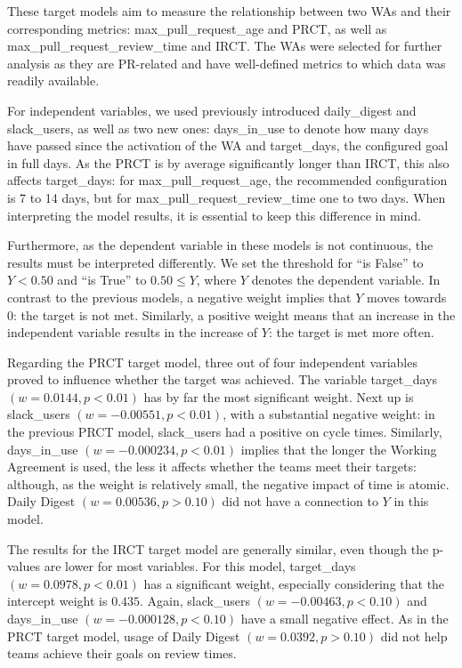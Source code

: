 

These target models aim to measure the relationship between two WAs and their corresponding metrics: max\_pull\_request\_age and PRCT, as well as max\_pull\_request\_review\_time and IRCT. The WAs were selected for further analysis as they are PR-related and have well-defined metrics to which data was readily available.

For independent variables, we used previously introduced daily\_digest and slack\_users, as well as two new ones: days\_in\_use to denote how many days have passed since the activation of the WA and target\_days, the configured goal in full days. As the PRCT is by average significantly longer than IRCT, this also affects target\_days: for max\_pull\_request\_age, the recommended configuration is 7 to 14 days, but for max\_pull\_request\_review\_time one to two days. When interpreting the model results, it is essential to keep this difference in mind. 

Furthermore, as the dependent variable in these models is not continuous, the results must be interpreted differently. We set the threshold for ``is False'' to  $Y<0.50$ and ``is True'' to $0.50\leq Y$, where $Y$ denotes the dependent variable. In contrast to the previous models, a negative weight implies that $Y$ moves towards 0: the target is not met. Similarly, a positive weight means that an increase in the independent variable results in the increase of $Y$: the target is met more often.



Regarding the PRCT target model, three out of four independent variables proved to influence whether the target was achieved. The variable target\_days $(w=0.0144, p<0.01)$ has by far the most significant weight. Next up is slack\_users $(w=-0.00551, p<0.01)$, with a substantial negative weight: in the previous PRCT model, slack\_users had a positive on cycle times. Similarly, days\_in\_use $(w=-0.000234, p<0.01)$ implies that the longer the Working Agreement is used, the less it affects whether the teams meet their targets: although, as the weight is relatively small, the negative impact of time is atomic. Daily Digest $(w=0.00536, p>0.10)$ did not have a connection to $Y$ in this model.

The results for the IRCT target model are generally similar, even though the p-values are lower for most variables. For this model, target\_days $(w=0.0978, p<0.01)$ has a significant weight, especially considering that the intercept weight is $0.435$. Again, slack\_users $(w=-0.00463, p<0.10)$ and days\_in\_use $(w=-0.000128, p<0.10)$ have a small negative effect. As in the PRCT target model, usage of Daily Digest $(w=0.0392, p>0.10)$ did not help teams achieve their goals on review times.

